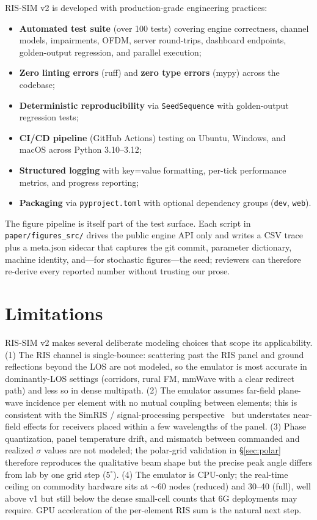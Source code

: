 \documentclass{article}
\begin{document}
RIS-SIM v2 is developed with production-grade engineering practices:
\begin{itemize}
    \item \textbf{Automated test suite} (over 100 tests) covering engine correctness, channel models, impairments, OFDM, server round-trips, dashboard endpoints, golden-output regression, and parallel execution;
    \item \textbf{Zero linting errors} (ruff) and \textbf{zero type errors} (mypy) across the codebase;
    \item \textbf{Deterministic reproducibility} via \texttt{SeedSequence} with golden-output regression tests;
    \item \textbf{CI/CD pipeline} (GitHub Actions) testing on Ubuntu, Windows, and macOS across Python 3.10--3.12;
    \item \textbf{Structured logging} with key=value formatting, per-tick performance metrics, and progress reporting;
    \item \textbf{Packaging} via \texttt{pyproject.toml} with optional dependency groups (\texttt{dev}, \texttt{web}).
\end{itemize}

The figure pipeline is itself part of the test surface. Each script in \texttt{paper/figures\_src/} drives the public engine API only and writes a CSV trace plus a meta.json sidecar that captures the git commit, parameter dictionary, machine identity, and---for stochastic figures---the seed; reviewers can therefore re-derive every reported number without trusting our prose.

\section{Limitations}

RIS-SIM v2 makes several deliberate modeling choices that scope its applicability. (1) The RIS channel is single-bounce: scattering past the RIS panel and ground reflections beyond the LOS are not modeled, so the emulator is most accurate in dominantly-LOS settings (corridors, rural FM, mmWave with a clear redirect path) and less so in dense multipath. (2) The emulator assumes far-field plane-wave incidence per element with no mutual coupling between elements; this is consistent with the SimRIS / signal-processing perspective~\cite{basar2021simris,SPM_RIS} but understates near-field effects for receivers placed within a few wavelengths of the panel. (3) Phase quantization, panel temperature drift, and mismatch between commanded and realized $\sigma$ values are not modeled; the polar-grid validation in \S\ref{sec:polar} therefore reproduces the qualitative beam shape but the precise peak angle differs from lab by one grid step ($5^\circ$). (4) The emulator is CPU-only; the real-time ceiling on commodity hardware sits at $\sim 60$ nodes (reduced) and 30--40 (full), well above v1 but still below the dense small-cell counts that 6G deployments may require. GPU acceleration of the per-element RIS sum is the natural next step.
\end{document}
